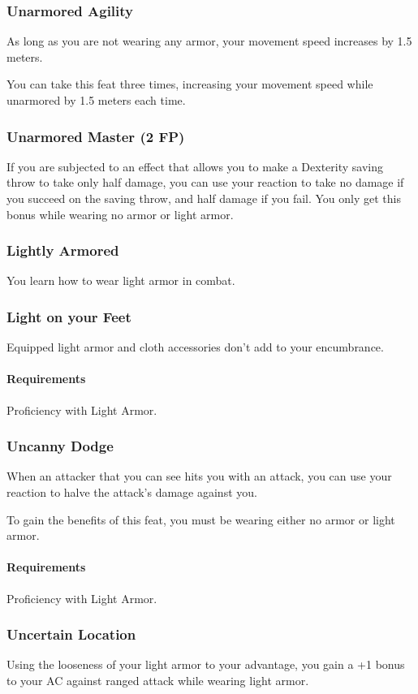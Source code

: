 \subsubsection{Unarmored Agility} \label{feat::unarmoredagility}
    As long as you are not wearing any armor, your movement speed increases by 1.5 meters.

    You can take this feat three times, increasing your movement speed while unarmored by 1.5 meters each time.
\subsubsection{Unarmored Master (2 FP)} \label{feat::unarmoredmaster}
    If you are subjected to an effect that allows you to make a Dexterity saving throw to take only half damage, you can use your reaction to take no damage if you succeed on the saving throw, and half damage if you fail.
    You only get this bonus while wearing no armor or light armor.
\subsubsection{Lightly Armored} \label{feat::lightlyarmored}
    You learn how to wear light armor in combat.
\subsubsection{Light on your Feet} \label{feat::lightonyourfeet}
    Equipped light armor and cloth accessories don't add to your encumbrance.
    \paragraph{Requirements} Proficiency with Light Armor.
\subsubsection{Uncanny Dodge} \label{feat::uncannydodge}
    When an attacker that you can see hits you with an attack, you can use your reaction to halve the attack's damage against you.

    To gain the benefits of this feat, you must be wearing either no armor or light armor.
    \paragraph{Requirements} Proficiency with Light Armor.
\subsubsection{Uncertain Location} \label{feat::uncertainlocation}
    Using the looseness of your light armor to your advantage, you gain a +1 bonus to your AC against ranged attack while wearing light armor.

